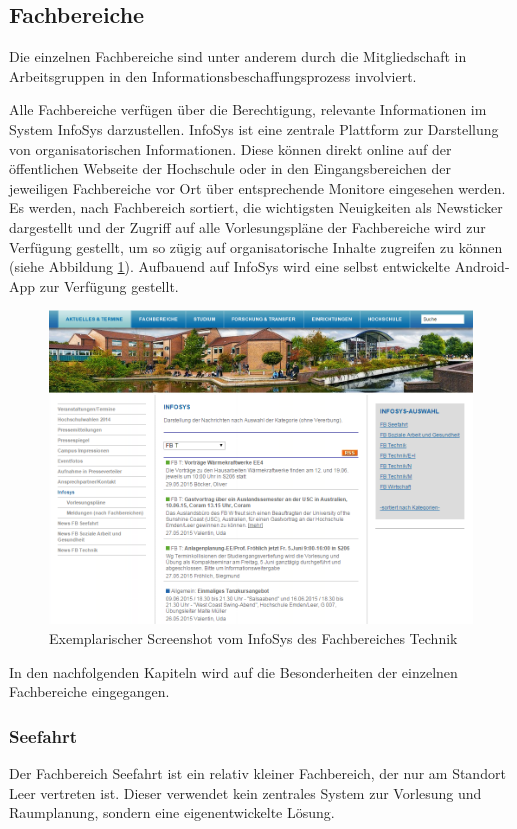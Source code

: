 \subsection{Fachbereiche}
Die einzelnen Fachbereiche sind unter anderem durch die Mitgliedschaft in Arbeitsgruppen in den Informationsbeschaffungsprozess involviert.

Alle Fachbereiche verfügen über die Berechtigung, relevante Informationen im System InfoSys darzustellen. InfoSys ist eine zentrale Plattform zur Darstellung von organisatorischen Informationen. Diese können direkt online auf der öffentlichen Webseite der Hochschule oder in den Eingangsbereichen der jeweiligen Fachbereiche vor Ort über entsprechende Monitore eingesehen werden. Es werden, nach Fachbereich sortiert, die wichtigsten Neuigkeiten als Newsticker dargestellt und der Zugriff auf alle Vorlesungspläne der Fachbereiche wird zur Verfügung gestellt, um so zügig auf organisatorische Inhalte zugreifen zu können (siehe Abbildung \ref{fig_InfoSys}). Aufbauend auf InfoSys wird eine selbst entwickelte Android-App zur Verfügung gestellt.

\begin{figure}[h!]
	\centering
	\includegraphics[width=14cm]{kapitel/gruppe2/bilder/InfoSys}
	\caption{Exemplarischer Screenshot vom InfoSys des Fachbereiches Technik}
	\label{fig_InfoSys}
\end{figure}

In den nachfolgenden Kapiteln wird auf die Besonderheiten der einzelnen Fachbereiche eingegangen.

\subsubsection{Seefahrt}
Der Fachbereich Seefahrt ist ein relativ kleiner Fachbereich, der nur am Standort Leer vertreten ist. Dieser verwendet kein zentrales System zur Vorlesung und Raumplanung, sondern eine eigenentwickelte Lösung. 

